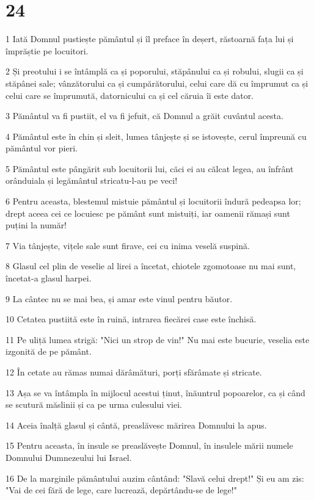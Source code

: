 \chapter{24}

\par 1 Iată Domnul pustiește pământul și îl preface în deșert, răstoarnă fața lui și împrăștie pe locuitori.
\par 2 Și preotului i se întâmplă ca și poporului, stăpânului ca și robului, slugii ca și stăpânei sale; vânzătorului ca și cumpărătorului, celui care dă cu împrumut ca și celui care se împrumută, datornicului ca și cel căruia îi este dator.
\par 3 Pământul va fi pustiit, el va fi jefuit, că Domnul a grăit cuvântul acesta.
\par 4 Pământul este în chin și sleit, lumea tânjește și se istovește, cerul împreună cu pământul vor pieri.
\par 5 Pământul este pângărit sub locuitorii lui, căci ei au călcat legea, au înfrânt orânduiala și legământul stricatu-l-au pe veci!
\par 6 Pentru aceasta, blestemul mistuie pământul și locuitorii îndură pedeapsa lor; drept aceea cei ce locuiesc pe pământ sunt mistuiți, iar oamenii rămași sunt puțini la număr!
\par 7 Via tânjește, vițele sale sunt firave, cei cu inima veselă suspină.
\par 8 Glasul cel plin de veselie al lirei a încetat, chiotele zgomotoase nu mai sunt, încetat-a glasul harpei.
\par 9 La cântec nu se mai bea, și amar este vinul pentru băutor.
\par 10 Cetatea pustiită este în ruină, intrarea fiecărei case este închisă.
\par 11 Pe uliță lumea strigă: "Nici un strop de vin!" Nu mai este bucurie, veselia este izgonită de pe pământ.
\par 12 În cetate au rămas numai dărâmături, porți sfărâmate și stricate.
\par 13 Așa se va întâmpla în mijlocul acestui ținut, înăuntrul popoarelor, ca și când se scutură măslinii și ca pe urma culesului viei.
\par 14 Aceia înalță glasul și cântă, preaslăvesc mărirea Domnului la apus.
\par 15 Pentru aceasta, în insule se preaslăvește Domnul, în insulele mării numele Domnului Dumnezeului lui Israel.
\par 16 De la marginile pământului auzim cântând: "Slavă celui drept!" Și eu am zis: "Vai de cei fără de lege, care lucrează, depărtându-se de lege!"
